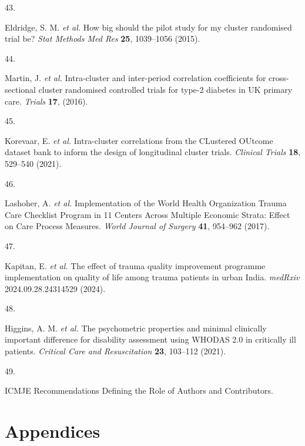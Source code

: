 \documentclass[
]{scrartcl}
\newlength{\cslhangindent}
\newlength{\csllabelwidth}
\newlength{\cslentryspacingunit} %
\newenvironment{CSLReferences}[2] %
 {%
  \setlength{\parindent}{0pt}
  \ifodd #1
  \let\oldpar\par
  \def\par{\hangindent=\cslhangindent\oldpar}
  \fi
  \setlength{\parskip}{#2\cslentryspacingunit}
 }%
 {}
\newcommand{\CSLLeftMargin}[1]{\parbox[t]{\csllabelwidth}{#1}}
\newcommand{\CSLRightInline}[1]{\parbox[t]{\linewidth - \csllabelwidth}{#1}\break}
\begin{document}
\begin{CSLReferences}{0}{0}
\leavevmode{}%
\CSLLeftMargin{43. }%
\CSLRightInline{Eldridge, S. M. \emph{et al.} How big should the pilot
study for my cluster randomised trial be? \emph{Stat Methods Med Res}
\textbf{25}, 1039--1056 (2015).}

\leavevmode{}%
\CSLLeftMargin{44. }%
\CSLRightInline{Martin, J. \emph{et al.} Intra-cluster and inter-period
correlation coefficients for cross-sectional cluster randomised
controlled trials for type-2 diabetes in UK primary care. \emph{Trials}
\textbf{17}, (2016).}

\leavevmode{}%
\CSLLeftMargin{45. }%
\CSLRightInline{Korevaar, E. \emph{et al.} Intra-cluster correlations
from the CLustered OUtcome dataset bank to inform the design of
longitudinal cluster trials. \emph{Clinical Trials} \textbf{18},
529--540 (2021).}

\leavevmode{}%
\CSLLeftMargin{46. }%
\CSLRightInline{Lashoher, A. \emph{et al.} Implementation of the {World}
{Health} {Organization} {Trauma} {Care} {Checklist} {Program} in 11
{Centers} {Across} {Multiple} {Economic} {Strata}: {Effect} on {Care}
{Process} {Measures}. \emph{World Journal of Surgery} \textbf{41},
954--962 (2017).}

\leavevmode{}%
\CSLLeftMargin{47. }%
\CSLRightInline{Kapitan, E. \emph{et al.} The effect of trauma quality
improvement programme implementation on quality of life among trauma
patients in urban {India}. \emph{medRxiv} 2024.09.28.24314529 (2024).}

\leavevmode{}%
\CSLLeftMargin{48. }%
\CSLRightInline{Higgins, A. M. \emph{et al.} The psychometric properties
and minimal clinically important difference for disability assessment
using {WHODAS} 2.0 in critically ill patients. \emph{Critical Care and
Resuscitation} \textbf{23}, 103--112 (2021).}

\leavevmode{}%
\CSLLeftMargin{49. }%
\CSLRightInline{{ICMJE} {\textbar} {Recommendations} {\textbar}
{Defining} the {Role} of {Authors} and {Contributors}.}

\end{CSLReferences}

\hypertarget{appendices}{%
\section{Appendices}\label{appendices}}
\end{document}
